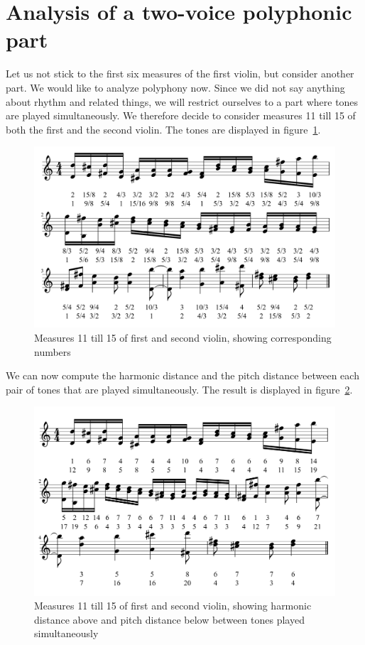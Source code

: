 \documentclass[a4paper]{book}
\theoremstyle{definition}
\begin{document}
\section{Analysis of a two-voice polyphonic part}
Let us not stick to the first six measures of the first violin, but consider another part.
We would like to analyze polyphony now.
Since we did not say anything about rhythm and related things, we will restrict ourselves to a part where tones are played simultaneously.
We therefore decide to consider measures 11 till 15 of both the first and the second violin.
The tones are displayed in figure~\ref{fig_first_second_violin_tones}.

\begin{figure}[H]
    \centering
    \includegraphics[scale=0.25]{figures/fig_first_second_violin_tones.png}
    \caption{Measures 11 till 15 of first and second violin, showing corresponding numbers}
    \label{fig_first_second_violin_tones}
\end{figure}

We can now compute the harmonic distance and the pitch distance between each pair of tones that are played simultaneously.
The result is displayed in figure~\ref{fig_first_second_violin_melodic_and_harmonic_distance_self}.

\begin{figure}[H]
    \centering
    \includegraphics[scale=0.25]{figures/fig_first_second_violin_melodic_and_harmonic_distance_self.png}
    \caption{Measures 11 till 15 of first and second violin, showing harmonic distance above and pitch distance below between tones played simultaneously}
    \label{fig_first_second_violin_melodic_and_harmonic_distance_self}
\end{figure}
\end{document}
